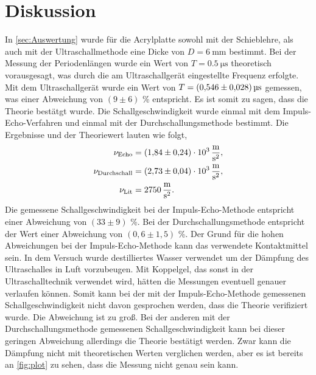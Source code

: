 \section{Diskussion}
\label{sec:Diskussion}

In \autoref{sec:Auswertung} wurde für die Acrylplatte sowohl mit der Schieblehre, als auch mit der Ultraschallmethode eine Dicke von $D = \SI{6}{\milli\meter}$
bestimmt. \newline
Bei der Messung der Periodenlängen wurde ein Wert von $T = \SI{0,5}{\micro\second}$ theoretisch vorausgesagt, was durch die am Ultraschallgerät eingestellte
Frequenz erfolgte. Mit dem Ultraschallgerät wurde ein Wert von $ T = \SI{0.546 \pm 0.028}{\micro\second}$ gemessen, was einer Abweichung von $(9 \pm 6)$ \%
entspricht. Es ist somit zu sagen, dass die Theorie bestätgt wurde. \newline
Die Schallgeschwindigkeit wurde einmal mit dem Impuls-Echo-Verfahren und einmal mit der Durchschallungsmethode bestimmt. Die Ergebnisse und der Theoriewert \cite{SchallgeschwAcryl} lauten wie folgt,
\begin{align*}
    \nu_{\text{Echo}} &= \SI{1,84 \pm 0,24 e3}{\meter\per\second\squared}, \\
    \nu_{\text{Durchschall}} &= \SI{2.73 \pm 0.04 e3}{\meter\per\second\squared}, \\
    \nu_{\text{Lit}} &= \SI{2750}{\meter\per\second\squared}.
\end{align*}
Die gemessene Schallgeschwindigkeit bei der Impuls-Echo-Methode entspricht einer Abweichung von $(33 \pm 9)$ \%. Bei der Durchschallungsmethode entspricht der
Wert einer Abweichung von $(0,6 \pm 1,5)$ \%. \newline
Der Grund für die hohen Abweichungen bei der Impuls-Echo-Methode kann das verwendete Kontaktmittel sein. In dem Versuch wurde destilliertes Wasser verwendet um der Dämpfung des Ultraschalles
in Luft vorzubeugen. Mit Koppelgel, das sonst in der Ultraschalltechnik verwendet wird, hätten die Messungen eventuell genauer verlaufen können. \newline
Somit kann bei der mit der Impuls-Echo-Methode gemessenen Schallgeschwindigkeit nicht davon gesprochen werden, dass die Theorie verifiziert wurde. Die Abweichung ist zu groß.
Bei der anderen mit der Durchschallungsmethode gemessenen Schallgeschwindigkeit kann bei dieser geringen Abweichung allerdings die Theorie bestätigt werden. \newline
Zwar kann die Dämpfung nicht mit theoretischen Werten verglichen werden, aber es ist bereits an \autoref{fig:plot} zu sehen, dass die Messung nicht genau sein kann.
